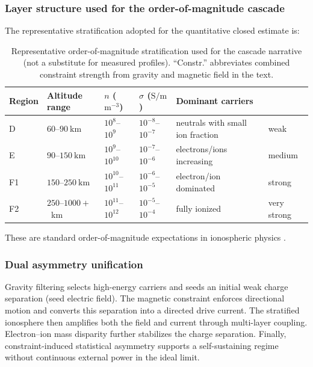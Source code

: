 \documentclass[11pt,a4paper]{article}
\begin{document}
\subsubsection{Layer structure used for the order-of-magnitude cascade}
The representative stratification adopted for the quantitative closed estimate is:
\begin{table}[ht]
\centering
\caption{Representative order-of-magnitude stratification used for the cascade narrative (not a substitute for measured profiles). ``Constr.'' abbreviates combined constraint strength from gravity and magnetic field in the text.}
\label{tab:iono-strata}
\renewcommand{\arraystretch}{1.2}
\scriptsize
\begin{tabular}{L{1.0cm} L{2.3cm} L{2.0cm} L{1.6cm} L{3.1cm} L{2.3cm}}
\hline
Region & Altitude range & $n$ ($\mathrm{m^{-3}}$) & $\sigma$ ($\mathrm{S/m}$) & Dominant carriers &  \\
\hline
D  & $60$--$90~\mathrm{km}$ & $10^8$--$10^9$ & $10^{-8}$--$10^{-7}$ & neutrals with small ion fraction & weak \\
E  & $90$--$150~\mathrm{km}$ & $10^9$--$10^{10}$ & $10^{-7}$--$10^{-6}$ & electrons/ions increasing & medium \\
F1 & $150$--$250~\mathrm{km}$ & $10^{10}$--$10^{11}$ & $10^{-6}$--$10^{-5}$ & electron/ion dominated & strong \\
F2 & $250$--$1000+$~km & $10^{11}$--$10^{12}$ & $10^{-5}$--$10^{-4}$ & fully ionized & very strong \\
\hline
\end{tabular}
\normalsize
\end{table}
These are standard order-of-magnitude expectations in ionospheric physics \cite{Kelley2009EarthIonosphere,SchunkNagy2009IonospherePhysics}.

\subsubsection{Dual asymmetry unification}
Gravity filtering selects high-energy carriers and seeds an initial weak charge separation (seed electric field). The magnetic constraint enforces directional motion and converts this separation into a directed drive current. The stratified ionosphere then amplifies both the field and current through multi-layer coupling. Electron--ion mass disparity further stabilizes the charge separation. Finally, constraint-induced statistical asymmetry supports a self-sustaining regime without continuous external power in the ideal limit.
\end{document}
